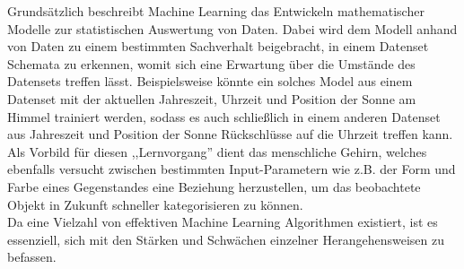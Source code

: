 Grundsätzlich beschreibt Machine Learning das Entwickeln mathematischer Modelle zur statistischen Auswertung
von Daten. Dabei wird dem Modell anhand von Daten zu einem bestimmten Sachverhalt beigebracht, in einem 
Datenset Schemata zu erkennen, womit sich eine Erwartung über die Umstände des Datensets treffen lässt.
Beispielsweise könnte ein solches Model aus einem Datenset mit der aktuellen Jahreszeit, Uhrzeit und 
Position der Sonne am Himmel trainiert werden, sodass es auch schließlich in einem anderen Datenset 
aus Jahreszeit und Position der Sonne Rückschlüsse auf die Uhrzeit treffen kann.\\
Als Vorbild für diesen ,,Lernvorgang'' dient das menschliche Gehirn, welches ebenfalls versucht zwischen 
bestimmten Input-Parametern wie z.B. der Form und Farbe eines Gegenstandes eine Beziehung herzustellen,
um das beobachtete Objekt in Zukunft schneller kategorisieren zu können.\\
Da eine Vielzahl von effektiven Machine Learning Algorithmen existiert, ist es essenziell, sich mit den
Stärken und Schwächen einzelner Herangehensweisen zu befassen.\newpage

